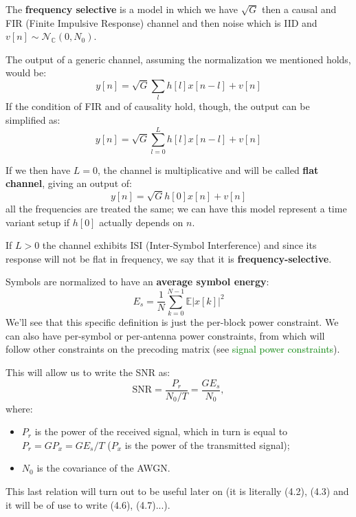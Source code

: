 \documentclass[a4paper, 12pt]{book}
\begin{document}
\begin{definition}
The \textbf{frequency selective} is a model in which we have $\sqrt{G}$ then a causal and FIR (Finite Impulsive Response) channel and then noise which is IID and $v[n] \sim \mathcal{N}_{\mathbb{C}}(0, N_0)$.

The output of a generic channel, assuming the normalization we mentioned holds, would be:
\begin{equation}
y[n] = \sqrt{G} \sum_{l} h[l]x[n-l] + v[n] \tag{2.69}
\end{equation}
If the condition of FIR and of causality hold, though, the output can be simplified as:
\begin{equation}
y[n] = \sqrt{G} \sum_{l=0}^{L} h[l]x[n-l] + v[n] \tag{2.70}
\end{equation}
\end{definition}

If we then have $L=0$, the channel is multiplicative and will be called \textbf{flat channel}, giving an output of:
\begin{equation}
y[n] = \sqrt{G}h[0]x[n] + v[n] \tag{2.71}
\end{equation}
all the frequencies are treated the same; we can have this model represent a time variant setup if $h[0]$ actually depends on $n$.

If $L > 0$ the channel exhibits ISI (Inter-Symbol Interference) and since its response will not be flat in frequency, we say that it is \textbf{frequency-selective}.

Symbols are normalized to have an \textbf{average symbol energy}:
\begin{equation}
E_s = \frac{1}{N} \sum_{k=0}^{N-1} \mathbb{E}|x[k]|^2
\end{equation}
We'll see that this specific definition is just the per-block power constraint.
We can also have per-symbol or per-antenna power constraints, from which will follow other constraints on the precoding matrix (see \textcolor{green}{signal power constraints}).

This will allow us to write the SNR as:
\begin{equation}
\text{SNR} = \frac{P_r}{N_0/T} = \frac{G E_s}{N_0},
\end{equation}
where:
\begin{itemize}
    \item $P_r$ is the power of the received signal, which in turn is equal to $P_r = G P_x = G E_s / T$ ($P_x$ is the power of the transmitted signal);
    \item $N_0$ is the covariance of the AWGN.
\end{itemize}
This last relation will turn out to be useful later on (it is literally (4.2), (4.3) and it will be of use to write (4.6), (4.7)...).
\end{document}
